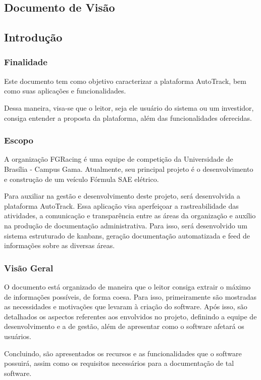 \begin{apendicesenv}

\partapendices
\chapter{Documento de Visão}
\label{appendix:apdcA}
\section{Introdução}
\subsection{Finalidade}
Este documento tem como objetivo caracterizar a plataforma AutoTrack, bem como suas aplicações e funcionalidades.

Dessa maneira, visa-se que o leitor, seja ele usuário do sistema ou um investidor, consiga entender a proposta da plataforma, além das funcionalidades oferecidas.

\subsection{Escopo}
A organização FGRacing é uma equipe de competição da Universidade de Brasília - Campus Gama. Atualmente, seu principal projeto é o desenvolvimento e construção de um veículo Fórmula SAE elétrico.

Para auxiliar na gestão e desenvolvimento deste projeto, será desenvolvida a plataforma AutoTrack. Essa aplicação visa aperfeiçoar a rastreabilidade das atividades, a comunicação e transparência entre as áreas da organização e auxílio na produção de documentação administrativa. Para isso, será desenvolvido um sistema estruturado de kanbans, geração documentação automatizada e feed de informações sobre as diversas áreas.


\subsection{Visão Geral}
O documento está organizado de maneira que o leitor consiga extrair o máximo de informações possíveis, de forma coesa. Para isso, primeiramente são mostradas as necessidades e motivações que levaram à criação do software. Após isso, são detalhados os aspectos referentes aos envolvidos no projeto, definindo a equipe de desenvolvimento e a de gestão, além de apresentar como o software afetará os usuários.

Concluindo, são apresentados os recursos e as funcionalidades que o software possuirá, assim como os requisitos necessários para a documentação de tal software.


\end{apendicesenv}
